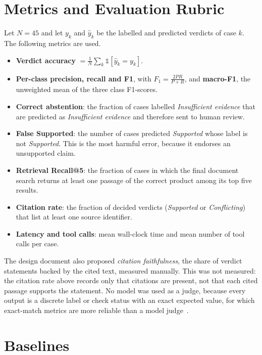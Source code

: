 \section{Metrics and Evaluation Rubric}

Let $N = 45$ and let $y_k$ and $\hat{y}_k$ be the labelled and predicted verdicts of case $k$. The
following metrics are used.

\begin{itemize}[itemsep=2pt]
\item \textbf{Verdict accuracy} $= \frac{1}{N}\sum_k \mathbb{1}[\hat{y}_k = y_k]$.
\item \textbf{Per-class precision, recall and F1}, with $F_1 = \frac{2PR}{P+R}$, and \textbf{macro-F1}, the
unweighted mean of the three class F1-scores.
\item \textbf{Correct abstention}: the fraction of cases labelled \emph{Insufficient evidence} that are
predicted as \emph{Insufficient evidence} and therefore sent to human review.
\item \textbf{False Supported}: the number of cases predicted \emph{Supported} whose label is not
\emph{Supported}. This is the most harmful error, because it endorses an unsupported claim.
\item \textbf{Retrieval Recall@5}: the fraction of cases in which the final document search returns at
least one passage of the correct product among its top five results.
\item \textbf{Citation rate}: the fraction of decided verdicts (\emph{Supported} or \emph{Conflicting})
that list at least one source identifier.
\item \textbf{Latency and tool calls}: mean wall-clock time and mean number of tool calls per case.
\end{itemize}

The design document also proposed \emph{citation faithfulness}, the share of verdict statements backed
by the cited text, measured manually. This was not measured: the citation rate above records only that
citations are present, not that each cited passage supports the statement. No model was used as a
judge, because every output is a discrete label or check status with an exact expected value, for
which exact-match metrics are more reliable than a model judge~\cite{zheng2023judge}.

\section{Baselines}


